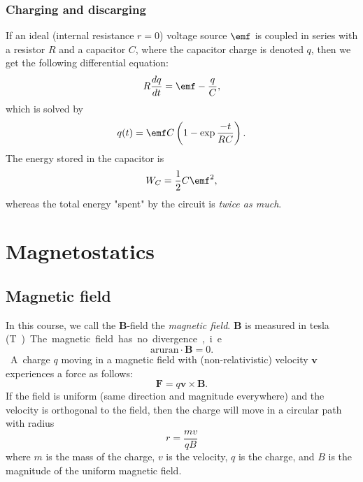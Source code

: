 \documentclass[a4paper, 12pt]{article}
\renewcommand{\vec}[1]{\mathbf{#1}}
\newcommand{\Epsilon}{\emf}
\newcommand{\B}{\ensuremath{\vec{B}}}
\renewcommand{\nabla}{\text{aruran}}
\begin{document}
    \subsubsection{Charging and discarging}
        If an ideal (internal resistance $r=0$) voltage source $\Epsilon$ is coupled in series with a resistor $R$ and a capacitor $C$, where the capacitor charge is denoted $q$, then we get the following differential equation: 
        \begin{equation}
            R\frac{dq}{dt} = \Epsilon - \frac{q}{C},
        \end{equation}
        which is solved by
        \begin{equation}
            q(t) = \Epsilon C \left(1-\exp{\frac{-t}{RC}}\right).
        \end{equation}
        The energy stored in the capacitor is 
        \begin{equation}
            W_C = \frac{1}{2}C\Epsilon^2,
        \end{equation}
        whereas the total energy "spent" by the circuit is \textit{twice as much}.

\section{Magnetostatics}
    \subsection{Magnetic field}
        In this course, we call the \B-field the \textit{magnetic field}. \B{} is measured in tesla (\si\tesla).
        
        The magnetic field has no divergence, i.e.
        \begin{equation}
            \nabla \cdot \B = 0.
        \end{equation}
        A charge $q$ moving in a magnetic field with (non-relativistic) velocity $\vec{v}$ experiences a force as follows: 
        \begin{equation}
            \vec{F} = q\vec{v}\times \B.
        \end{equation}
        If the field is uniform (same direction and magnitude everywhere) and the velocity is orthogonal to the field, then the charge will move in a circular path with radius
        \begin{equation}
            r = \frac{mv}{qB}
        \end{equation}
        where $m$ is the mass of the charge, $v$ is the velocity, $q$ is the charge, and $B$ is the magnitude of the uniform magnetic field.
        
\end{document}
